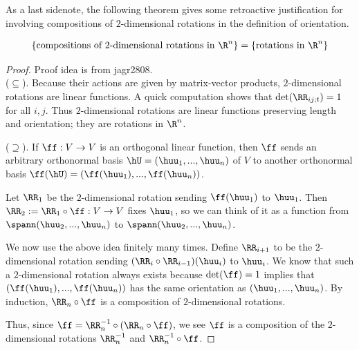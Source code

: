 As a last sidenote, the following theorem gives some retroactive justification for involving compositions of $2$-dimensional rotations in the definition of orientation.

\begin{theorem} 
    \begin{align*}
        \{\text{compositions of $2$-dimensional rotations in $\R^n$}\} = \{\text{rotations in $\R^n$}\}
    \end{align*}
\end{theorem}

\begin{proof}
    \scriptsize Proof idea is from jagr2808. 
    \fontsize{10pt}{12pt}\selectfont \\
    \indent ($\subseteq$). Because their actions are given by matrix-vector products, $2$-dimensional rotations are linear functions. A quick computation shows that $\det(\RR_{ij;t}) = 1$ for all $i, j$. Thus $2$-dimensional rotations are linear functions preserving length and orientation; they are rotations in $\R^n$.
    
    \indent ($\supseteq$). If $\ff:V \rightarrow V$ is an orthogonal linear function, then $\ff$ sends an arbitrary orthonormal basis $\hU = (\huu_1, ..., \huu_n)$ of $V$ to another orthonormal basis $\ff(\hU) = (\ff(\huu_1), ..., \ff(\huu_n))$.

    Let $\RR_1$ be the $2$-dimensional rotation sending $\ff(\huu_1)$ to $\huu_1$. Then $\RR_2 := \RR_1 \circ \ff:V \rightarrow V$ fixes $\huu_1$, so we can think of it as a function from $\spann(\huu_2, ..., \huu_n)$ to $\spann(\huu_2, ..., \huu_n)$. 
    
    We now use the above idea finitely many times. Define $\RR_{i + 1}$ to be the $2$-dimensional rotation sending ${(\RR_i \circ \RR_{i - 1})(\huu_i)}$ to $\huu_i$. We know that such a $2$-dimensional rotation always exists because $\det(\ff) = 1$ implies that $(\ff(\huu_1), ..., \ff(\huu_n))$ has the same orientation as $(\huu_1, ..., \huu_n)$. By induction, $\RR_n \circ \ff$ is a composition of $2$-dimensional rotations.
    
    Thus, since $\ff = \RR_n^{-1} \circ (\RR_n \circ \ff)$, we see $\ff$ is a composition of the $2$-dimensional rotations $\RR_n^{-1}$ and $\RR_n^{-1} \circ \ff$.
    

\end{proof}

